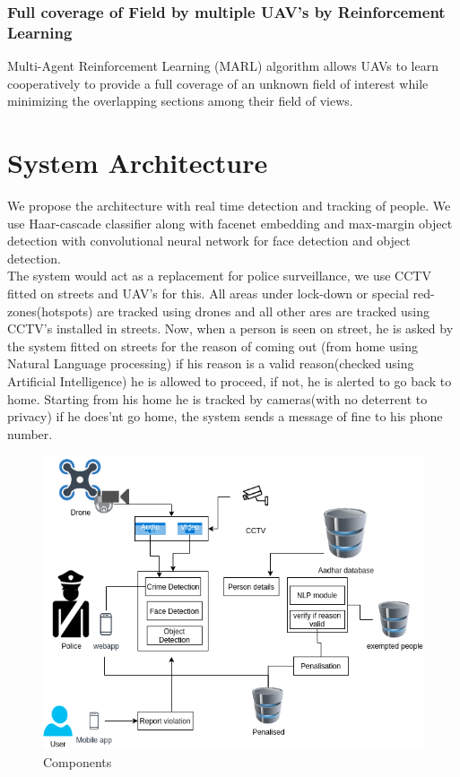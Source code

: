 \documentclass[10pt,twocolumn,letterpaper]{article}
\begin{document}
\subsubsection{Full coverage of Field by multiple UAV's by Reinforcement Learning}
Multi-Agent Reinforcement Learning (MARL) algorithm \cite{ham2018cooperative}allows UAVs to learn cooperatively to provide a full coverage of an unknown field of interest while minimizing the overlapping sections among their field of views. 
\cite{opencv_library} 
\section{System Architecture}
We propose the architecture with real time detection and tracking of people. We use Haar-cascade classifier along with facenet embedding and max-margin object detection with convolutional neural network  for face detection and object detection. \\
The system would act as a replacement for police surveillance, we use CCTV fitted on streets and UAV's for this. All areas under lock-down or special red-zones(hotspots) are tracked using drones and all other ares are tracked using CCTV's installed in streets. Now, when a person is seen on street, he is asked by the system fitted on streets for the reason of coming out (from home using Natural Language processing) if his reason is a valid reason(checked using Artificial Intelligence) he is allowed to proceed, if not, he is alerted to go back to home. Starting from his home he is tracked by cameras(with no deterrent to privacy) if he does'nt go home, the system sends a message of fine to his phone number. \\

 \begin{figure}
    \includegraphics[width=.5\textwidth,height=.4\textheight,keepaspectratio]{images/componets.png} 
      \caption{Components}
\end{figure}
\end{document}
